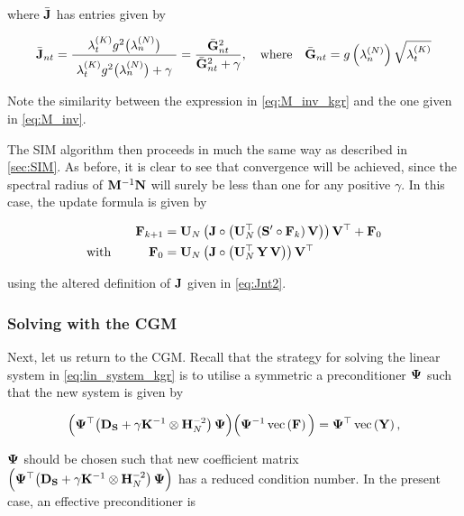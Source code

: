 where $\bar{\mathbf{J}}$ has entries given by 

\begin{equation}
    \label{eq:Jnt2}
    \bar{\J}_{nt} = \frac{\lambda^{(K)}_t g^2\big(\lambda_n^{(N)}\big)}{ \raisebox{-0.2cm} { $\lambda^{(K)}_t g^2\big(\lambda_n^{(N)}\big) + \gamma$ } } = \frac{\bar{\G}_{nt}^2}{\bar{\G}_{nt}^2 + \gamma}, \where \bar{\G}_{nt} = g\left(\lambda^{(N)}_n\right) \sqrt{\lambda^{(K)}_t} 
\end{equation}

Note the similarity between the expression in \cref{eq:M_inv_kgr} and the one given in \cref{eq:M_inv}.

The SIM algorithm then proceeds in much the same way as described in \cref{sec:SIM}. As before, it is clear to see that convergence will be achieved, since the spectral radius of $\mathbf{M}^{-1}\mathbf{N}$ will surely be less than one for any positive $\gamma$. In this case, the update formula is given by 

\begin{align}
    \label{eq:update_sim_kgr}
    \mathbf{F}_{k+1} & = \mathbf{U}_N \, \big( \mathbf{J}  \circ \big( \mathbf{U}_N^\top \, (\mathbf{S}' \circ \mathbf{F}_{k})\, \mathbf{V} \big) \big) \, \mathbf{V}^\top + \mathbf{F}_0 \\
    \label{eq:update_sim_kgr2}
    \text{with} \quad\quad\quad \mathbf{F}_0 & = \mathbf{U}_N \, \big( \mathbf{J}  \circ \big( \mathbf{U}_N^\top \, \mathbf{Y} \, \mathbf{V} \big) \big) \, \mathbf{V}^\top 
\end{align}

using the altered definition of $\mathbf{J}$ given in \cref{eq:Jnt2}. 

\subsubsection{Solving with the CGM}

Next, let us return to the CGM. Recall that the strategy for solving the linear system in \cref{eq:lin_system_kgr} is to utilise a symmetric a preconditioner $\mathbf{\Psi}$ such that the new system is given by 

\begin{equation}
    \Big(\mathbf{\Psi}^\top  \big(\mathbf{D}_{\mathbf{S}} + \gamma \mathbf{K}^{-1} \otimes \mathbf{H}_N^{-2} \big) \, \mathbf{\Psi}  \Big) \Big(\mathbf{\Psi}^{-1}\, \text{\textup{vec}}\left( \mathbf{F} \right) \Big) = \mathbf{\Psi}^\top \, \text{\textup{vec}}\left(\mathbf{Y}\right),
\end{equation}

$\mathbf{\Psi}$ should be chosen such that new coefficient matrix $\Big(\mathbf{\Psi}^\top \big(\mathbf{D}_{\mathbf{S}} + \gamma \mathbf{K}^{-1} \otimes \mathbf{H}_N^{-2} \big) \, \mathbf{\Psi}  \Big)$ has a reduced condition number. In the present case, an effective preconditioner is 

